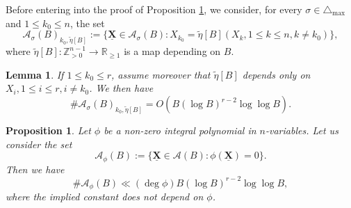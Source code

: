 \documentclass[10pt,a4paper]{amsart}
\newtheorem{proposition}{Proposition}
\newtheorem{lemma}{Lemma}
\newcommand{\BR}{{\mathbb {R}}}
\newcommand{\BZ}{{\mathbb {Z}}}
\newcommand{\CA}{{\mathcal {A}}}
\newcommand{\XX}{\underline{\mathbf{X}}}
\begin{document}
Before entering into the proof of Proposition \ref{prop:subvar}, we consider, for every $\sigma\in\triangle_{\max}$ and $1\leqslant k_0\leqslant n$, the set \begin{equation}\label{eq:CABik}
	\CA_\sigma(B)_{k_0,\widetilde{\eta}[B]}:=\{\XX\in\CA_\sigma(B):X_{k_0}=\widetilde{\eta}[B](X_k,1\leqslant k\leqslant n,k\neq k_0)\},
\end{equation} where $\widetilde{\eta}[B]:\BZ_{>0}^{n-1}\to\BR_{\geqslant 1}$ is a map depending on $B$.

\begin{lemma}\label{le:CABik}
		If $1\leqslant k_0\leqslant r$, assume moreover that $\widetilde{\eta}[B]$ depends only on $X_i,1\leqslant i\leqslant r,i\neq k_0$. We then have $$\#\CA_\sigma(B)_{k_0,\widetilde{\eta}[B]}=O(B(\log B)^{r-2}\log\log B).$$
\end{lemma}

\begin{proposition}\label{prop:subvar}
	Let $\phi$ be a non-zero integral polynomial in $n$-variables. Let us consider the set 
\begin{equation}\label{eq:CAphi}
		\CA_{\phi}(B):=\{\XX\in\CA(B):\phi(\XX)=0\}.
\end{equation}
	Then we have
	$$\#\CA_{\phi}(B)\ll (\deg \phi) B(\log B)^{r-2}\log\log B,$$ where the implied constant does not depend on $\phi$.
\end{proposition}
\end{document}
